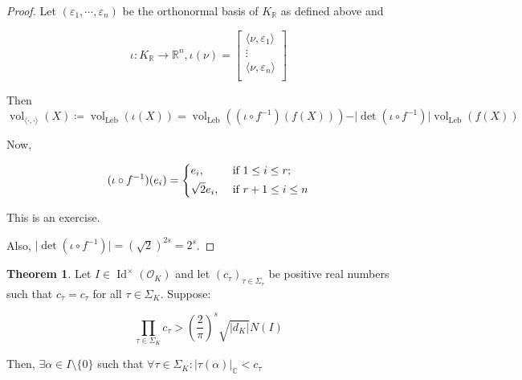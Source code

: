 \documentclass[openany]{amsbook}
\numberwithin{section}{chapter}
\theoremstyle{definition}
\newtheorem{theorem}{Theorem}[chapter]
\begin{document}
\begin{proof}
    Let \((\varepsilon_1, \cdots , \varepsilon_n)\) be the orthonormal basis of \(K_\mathbb{R}\) as defined above and 

    \[
        \iota : K_\mathbb{R} \to \mathbb{R}^n, \iota (\nu) = \begin{bmatrix}
             \langle \nu , \varepsilon_1 \rangle \\
             \vdots \\
             \langle \nu , \varepsilon_n \rangle \\
        \end{bmatrix}
    \]

    Then \(\operatorname{vol}_{\langle \cdot,\cdot \rangle}(X) \coloneqq \operatorname{vol}_{\operatorname{Leb}}(\iota(X)) = \operatorname{vol}_{\operatorname{Leb}}((\iota \circ f ^{-1})(f(X))) - \vert \det (\iota \circ f ^{-1}) \vert \operatorname{vol}_{\operatorname{Leb}}(f(X))\) 

    Now,

    \[
        (\iota \circ f ^{-1})(e_i) = \begin{dcases}
            e_i, &\text{ if } 1 \leq i \leq r ;\\
            \sqrt{2} e_i, &\text{ if } r+1 \leq i \leq n
        \end{dcases}
    \]

    This is an exercise.

    Also, \(\vert \det (\iota \circ f ^{-1}) \vert = (\sqrt{2})^{2s} = 2^s\).
\end{proof}

\begin{theorem}
    Let \(I \in \operatorname{Id}^\times (\mathcal{O}_K)\) and let \((c_\tau)_{\tau\in \Sigma_{\tau}}\) be positive real numbers such that \(c_{\overline{\tau}} = c_\tau\) for all \(\tau\in \Sigma_K\). Suppose:
    
    \[
        \prod_{\tau \in \Sigma_K} c_\tau > \left( \frac{2}{\pi} \right)^s \sqrt{\vert d_K \vert} N(I)  
    \]

    Then, \(\exists \alpha \in I \setminus \{ 0 \} \) such that \(\forall \tau  \in \Sigma_K : \vert \tau(\alpha) \vert _{\mathbb{C}} < c_\tau\) 
\end{theorem}
\end{document}
